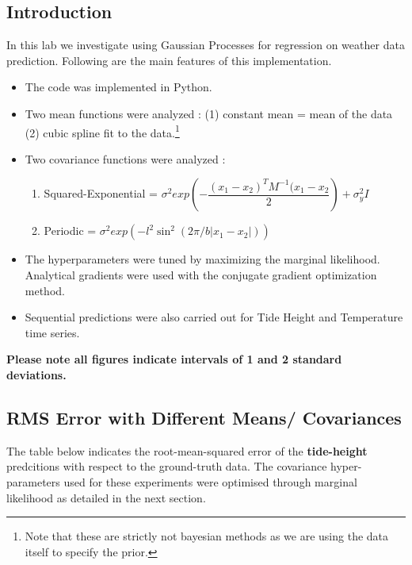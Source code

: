 \documentclass[11pt]{report}
\begin{document}
\maketitle
\subsection*{Introduction}
In this lab we investigate using Gaussian Processes for regression on weather data prediction. Following are the main features of this implementation.
\begin{itemize}
    \item The code was implemented in Python.
    \item Two mean functions were analyzed : (1) constant mean = mean of the data (2) cubic spline fit to the data.\footnote{ Note that these are strictly not bayesian methods as we are using the data itself to specify the prior.}
    \item Two covariance functions were analyzed :
        \begin{enumerate}
        \item Squared-Exponential = $\sigma^2 exp\left(-\dfrac{(x_1-x_2)^TM^{-1}(x_1-x_2}{2}\right) + \sigma_y^2I$
        \item Periodic  = $\sigma^2 exp\left(-l^2\sin^2(2\pi/b|x_1-x_2|)\right)$
        \end{enumerate}
        \item The hyperparameters were tuned by maximizing the marginal likelihood. Analytical gradients were used with the conjugate gradient optimization method.
        \item Sequential predictions were also carried out for Tide Height and Temperature time series.
\end{itemize}
\textbf{Please note all figures indicate intervals of 1 and 2 standard deviations.}
\subsection*{RMS Error with Different Means/ Covariances}
The table below indicates the root-mean-squared error of the \textbf{tide-height} predcitions with respect to the ground-truth data. The covariance hyper-parameters used for these experiments were optimised through marginal likelihood as detailed in the next section.
\end{document}
